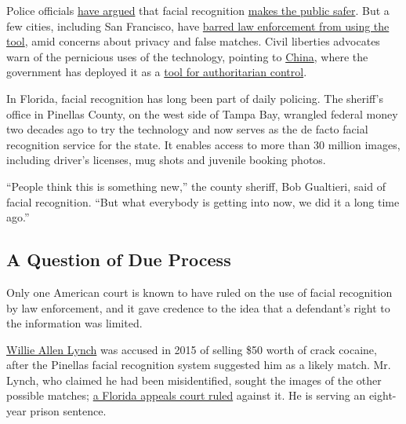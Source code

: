 Police officials
\href{https://www.nytimes3xbfgragh.onion/2019/06/09/opinion/facial-recognition-police-new-york-city.html}{have
argued} that facial recognition
\href{https://www.nytimes3xbfgragh.onion/2019/05/18/us/facial-recognition-police.html}{makes
the public safer}. But a few cities, including San Francisco, have
\href{https://www.nytimes3xbfgragh.onion/2019/05/14/us/facial-recognition-ban-san-francisco.html}{barred
law enforcement from using the tool}, amid concerns about privacy and
false matches. Civil liberties advocates warn of the pernicious uses of
the technology, pointing to
\href{https://www.nytimes3xbfgragh.onion/2019/04/14/technology/china-surveillance-artificial-intelligence-racial-profiling.html}{China},
where the government has deployed it as a
\href{https://www.nytimes3xbfgragh.onion/2019/12/17/technology/china-surveillance.html}{tool
for authoritarian control}.

In Florida, facial recognition has long been part of daily policing. The
sheriff's office in Pinellas County, on the west side of Tampa Bay,
wrangled federal money two decades ago to try the technology and now
serves as the de facto facial recognition service for the state. It
enables access to more than 30 million images, including driver's
licenses, mug shots and juvenile booking photos.

``People think this is something new,'' the county sheriff, Bob
Gualtieri, said of facial recognition. ``But what everybody is getting
into now, we did it a long time ago.''

\hypertarget{a-question-of-due-process}{%
\subsection{A Question of Due Process}\label{a-question-of-due-process}}

Only one American court is known to have ruled on the use of facial
recognition by law enforcement, and it gave credence to the idea that a
defendant's right to the information was limited.

\href{https://www.nydailynews.com/news/crime/50-crack-sale-florida-lead-facial-recognition-change-article-1.3888958}{Willie
Allen Lynch} was accused in 2015 of selling \$50 worth of crack cocaine,
after the Pinellas facial recognition system suggested him as a likely
match. Mr. Lynch, who claimed he had been misidentified, sought the
images of the other possible matches;
\href{https://law.justia.com/cases/florida/first-district-court-of-appeal/2018/16-3290.html}{a
Florida appeals court ruled} against it. He is serving an eight-year
prison sentence.

